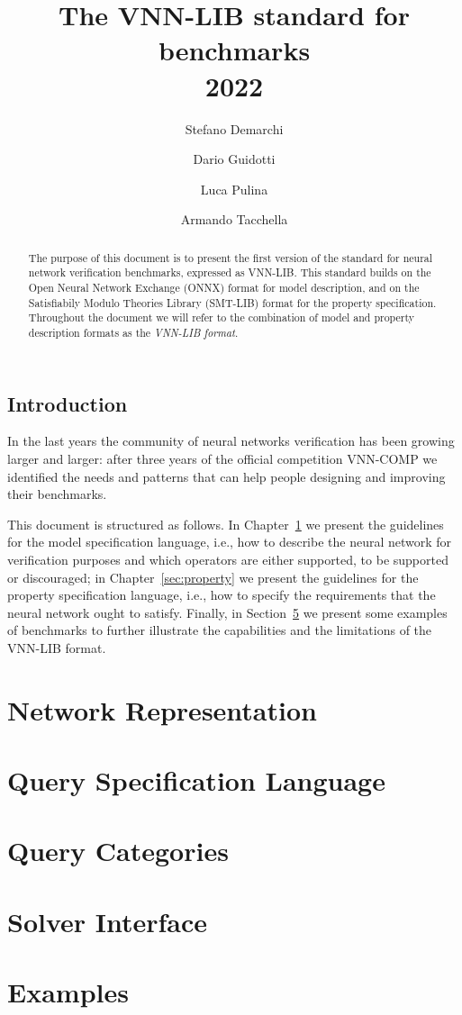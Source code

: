 \documentclass[12pt,a4paper]{report}
\title{The VNN-LIB standard for benchmarks\\2022}
\author[1]{Stefano Demarchi}
\author[2]{Dario Guidotti}
\author[2]{Luca Pulina}
\author[1]{Armando Tacchella}
\affil[1]{University of Genoa, Viale Causa 13, 16145 Genoa, Italy}
\affil[2]{University of Sassari, Via Roma 151, 07100 Sassari, Italy}
\begin{document}
\maketitle

\begin{abstract}
  The purpose of this document is to present the first version of the
  standard for neural network verification benchmarks, expressed as
  VNN-LIB. This standard builds on the Open Neural Network Exchange 
  (ONNX) format for model description, and on the Satisfiabily Modulo
  Theories Library (SMT-LIB) format for the property specification. 
  Throughout the document we will refer to the combination of model 
  and property description formats as the \emph{VNN-LIB format}.
\end{abstract}


\section*{Introduction}

In the last years the community of neural networks verification has
been growing larger and larger: after three years of the official
competition VNN-COMP we identified the needs and patterns that can
help people designing and improving their benchmarks.

This document is structured as follows. In Chapter~\ref{sec:model} we
present the guidelines for the model specification language, i.e., how
to describe the neural network for verification purposes and which 
operators are either supported, to be supported or discouraged; in
Chapter~\ref{sec:property} we present the guidelines for the property
specification language, i.e., how to specify the requirements that the
neural network ought to satisfy. Finally, in Section~\ref{sec:examples} 
we present some examples of benchmarks to further illustrate the
capabilities and the limitations of the VNN-LIB format.

\chapter{Network Representation}
\label{sec:model}


\chapter{Query Specification Language}
\label{sec:synax}

\label{sec:semantics}

\chapter{Query Categories}
\label{sec:linearity}

\label{sec:reachability}

\label{sec:dnf}

\chapter{Solver Interface}
\label{sec:functionalities}

\label{sec:counterexamples}

\label{sec:proof_certificates}

\chapter{Examples}
\label{sec:examples}


\end{document}
